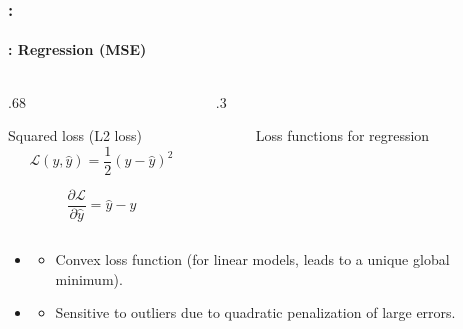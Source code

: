 \documentclass[xcolor=table]{beamer}
\begin{document}
\begin{frame}
	\frametitle{\insertshortsubtitle: \insertsection}
	\framesubtitle{\insertsubsection: Regression (MSE)}

	\begin{columns}
		\begin{column}{.68\linewidth}
			\begin{block}{Squared loss (L2 loss)}
				\[\mathcal{L}(y, \hat{y}) = \frac{1}{2} (y - \hat{y})^2\]
				
				\[
				\frac{\partial \mathcal{L}}{\partial \hat{y}} = \hat{y} - y
				\]
			\end{block}
			
		\end{column}%
		\begin{column}{.3\linewidth}
			\begin{figure}
				\caption{Loss functions for regression \cite{2017-rosenberg}}
			\end{figure}
		\end{column}
	\end{columns}

	\begin{itemize}
		\item {}
		\begin{itemize}
			\item Convex loss function (for linear models, leads to a unique global minimum).
		\end{itemize}
		\item {}
		\begin{itemize}
			\item Sensitive to outliers due to quadratic penalization of large errors.
		\end{itemize}
	\end{itemize}

\end{frame}
\end{document}
